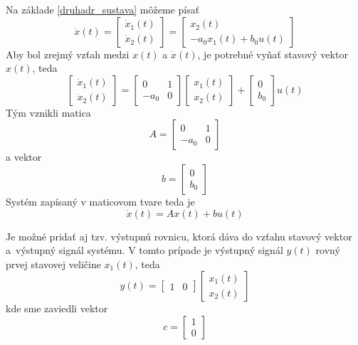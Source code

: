 \documentclass[a4paper, 10pt, ]{article}
\begin{document}
Na základe \eqref{druhadr_sustava} môžeme písať
\begin{equation}
    \dot x(t) = \begin{bmatrix} \dot x_1(t) \\ \dot x_2(t) \end{bmatrix} = \begin{bmatrix} x_2(t) \\ - a_0 x_1(t) +  b_0 u(t) \end{bmatrix}
\end{equation}
Aby bol zrejmý vzťah medzi $x(t)$ a $\dot x(t)$, je potrebné vyňať stavový vektor $x(t)$, teda 
\begin{equation}
     \begin{bmatrix} \dot x_1(t) \\ \dot x_2(t) \end{bmatrix} = \begin{bmatrix} 0 & 1 \\ -a_0 & 0 \end{bmatrix} \begin{bmatrix} x_1(t) \\ x_2(t) \end{bmatrix} + \begin{bmatrix} 0 \\ b_0 \end{bmatrix} u(t)
\end{equation}
Tým vznikli matica 
\begin{equation}
    A = \begin{bmatrix} 0 & 1 \\ -a_0 & 0 \end{bmatrix}
\end{equation}
a vektor
\begin{equation}
    b = \begin{bmatrix} 0 \\ b_0 \end{bmatrix}
\end{equation}
Systém zapísaný v maticovom tvare teda je
\begin{equation} \label{stavovyPriestorPriklad}
    \dot x(t) = Ax(t) + bu(t)   
\end{equation}

Je možné pridať aj tzv. výstupnú rovnicu, ktorá dáva do vzťahu stavový vektor a~výstupný signál systému. V tomto prípade je výstupný signál $y(t)$ rovný prvej stavovej veličine $x_1(t)$, teda
\begin{equation}
    y(t) = \begin{bmatrix} 1 & 0 \end{bmatrix} \begin{bmatrix} x_1(t) \\ x_2(t) \end{bmatrix}
\end{equation}
kde sme zaviedli vektor 
\begin{equation}
    c = \begin{bmatrix} 1 \\ 0 \end{bmatrix}
\end{equation}
\end{document}
